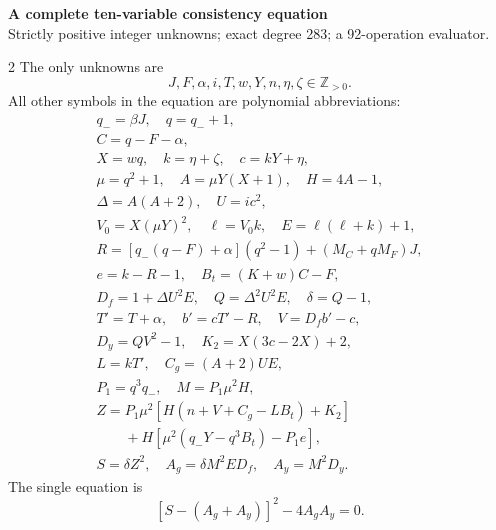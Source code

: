 \documentclass[10pt]{article}
\begin{document}
\begin{center}
{\large\bfseries A complete ten-variable consistency equation}\\[-1pt]
{\small Strictly positive integer unknowns; exact degree 283; a 92-operation evaluator.}
\end{center}\vspace{-8pt}
\begin{multicols}{2}
\fontsize{9}{9.5}\selectfont
The only unknowns are
\[
J,F,\alpha,i,T,w,Y,n,\eta,\zeta\in\mathbb Z_{>0}.
\]
All other symbols in the equation are polynomial abbreviations:
\[
\begin{gathered}
q_-=\beta J,\quad q=q_-+1,\\
C=q-F-\alpha,\\
X=wq,\quad k=\eta+\zeta,\quad c=kY+\eta,\\
\mu=q^2+1,\quad A=\mu Y(X+1),\quad H=4A-1,\\
\Delta=A(A+2),\quad U=ic^2,\\
V_0=X(\mu Y)^2,\quad\ell=V_0k,\quad E=\ell(\ell+k)+1,\\
R=[q_-(q-F)+\alpha](q^2-1)+(M_C+qM_F)J,\\
e=k-R-1,\quad B_t=(K+w)C-F,\\
D_f=1+\Delta U^2E,\quad Q=\Delta^2U^2E,\quad\delta=Q-1,\\
T'=T+\alpha,\quad b'=cT'-R,\quad V=D_fb'-c,\\
D_y=QV^2-1,\quad K_2=X(3c-2X)+2,\\
L=kT',\quad C_g=(A+2)UE,\\
P_1=q^3q_-,\quad M=P_1\mu^2H,\\
Z=P_1\mu^2[H(n+V+C_g-LB_t)+K_2]\\
\qquad+H[\mu^2(q_-Y-q^3B_t)-P_1e],\\
S=\delta Z^2,\quad A_g=\delta M^2ED_f,\quad A_y=M^2D_y.
\end{gathered}
\]
The single equation is
\[
\boxed{[S-(A_g+A_y)]^2-4A_gA_y=0.}
\]


\end{multicols}
\end{document}
